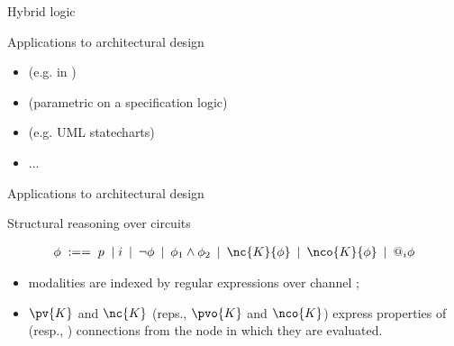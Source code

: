 \documentclass{beamer}
\begin{document}
\begin{slide}{Hybrid logic}\label{s:51b}
\small


\begin{block}{Applications to architectural design}
\begin{itemize}
\item {} (e.g. in \reo)
\item {} (parametric on a specification logic)
\item {} (e.g. UML statecharts)
\item ...
\end{itemize}
\end{block}
\begin{flushright}
\end{flushright}
\end{slide}

\begin{slide}{Applications to architectural design}\label{s:52}
\small

\begin{block}{Structural reasoning over \reo circuits}

$$
\begin{array}{c}
\phi\; :== \; p\; \mid i \: \mid\: \neg \phi \: \mid\: \phi_1 \land \phi_2\:  \mid\: \nc{K}{\phi} \:   \mid\:  \nco{K}{\phi} \:  \mid \: @_i \phi
\end{array}
$$
\begin{itemize}
\item modalities are indexed by regular expressions over channel ;
\item $\pv{K}$ and $\nc{K}$ (reps., $\pvo{K}$ and $\nco{K}$) express properties of  (resp., ) connections from the node in which they are evaluated.
\end{itemize}
\end{block}
\begin{flushright}
\end{flushright}
\end{slide}
\end{document}
